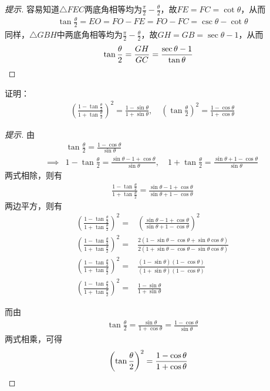 \begin{proof}[提示]
  容易知道$\triangle FEC$两底角相等均为$\frac\pi2 - \frac\theta2$，故$FE=FC=\cot\theta$，从而
  \begin{align*}
    \tan\frac\theta2 = EO = FO - FE = FO - FC = \csc\theta - \cot\theta
  \end{align*}
  同样，$\triangle GBH$中两底角相等均为$\frac\pi2 - \frac\theta2$，故$GH=GB=\sec\theta - 1$，从而
  \begin{align*}
    \tan\frac\theta2 = \frac{GH}{GC} = \frac{\sec\theta - 1}{\tan\theta}&\qedhere
  \end{align*}
\end{proof}

\begin{example}证明：
  \begin{align*}
    \left( \frac{1 - \tan\frac\theta2}{1 + \tan\frac\theta2} \right)^2 =
    \frac{1 - \sin\theta}{1+\sin\theta}, \quad
    \left( \tan\frac\theta2 \right)^2 = \frac{1-\cos\theta}{1+\cos\theta}
  \end{align*}
\end{example}
\begin{proof}[提示]
由
  \begin{align*}
    &\tan\frac\theta2 = \frac{1-\cos\theta}{\sin\theta}\\
    \implies&
    1 - \tan\frac\theta2 = \frac{\sin\theta - 1+\cos\theta}{\sin\theta},\quad
    1 + \tan\frac\theta2 = \frac{\sin\theta + 1-\cos\theta}{\sin\theta}
  \end{align*}
  两式相除，则有
  \begin{align*}
    \frac{1 - \tan\frac\theta2}{1 + \tan\frac\theta2} = 
    \frac{\sin\theta - 1+\cos\theta}{\sin\theta + 1-\cos\theta}
  \end{align*}
  两边平方，则有
  \begin{align*}
    \left( \frac{1 - \tan\frac\theta2}{1 + \tan\frac\theta2} \right)^2 ={}&
     \left( \frac{\sin\theta - 1+\cos\theta}{\sin\theta + 1-\cos\theta} \right)^2\\
    \left( \frac{1 - \tan\frac\theta2}{1 + \tan\frac\theta2} \right)^2 ={}&
             \frac{2(1 - \sin\theta - \cos\theta + \sin\theta\cos\theta)}{2(1+\sin\theta-\cos\theta-\sin\theta\cos\theta)}\\
    \left( \frac{1 - \tan\frac\theta2}{1 + \tan\frac\theta2} \right)^2 ={}&
             \frac{(1 - \sin\theta)(1 - \cos\theta)}{(1+\sin\theta)(1-\cos\theta)}\\
    \left( \frac{1 - \tan\frac\theta2}{1 + \tan\frac\theta2} \right)^2 ={}&
             \frac{1 - \sin\theta}{1+\sin\theta}
  \end{align*}

  而由
  \begin{align*}
    \tan\frac\theta2 = \frac{\sin\theta}{1+\cos\theta} = \frac{1-\cos\theta}{\sin\theta}
  \end{align*}
  两式相乘，可得
  \begin{align*}
    \left(\tan\frac\theta2\right)^2 = \frac{1-\cos\theta}{1+\cos\theta}&\qedhere
  \end{align*}
\end{proof}


